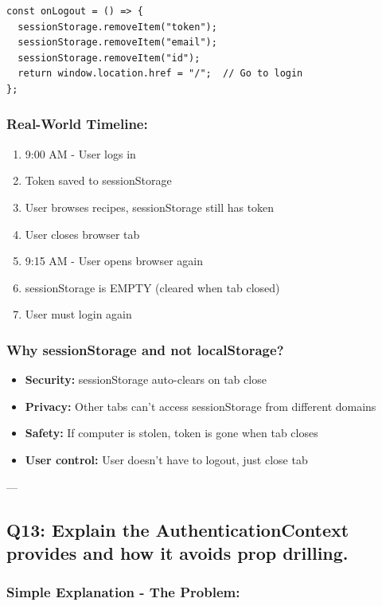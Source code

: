 \documentclass[12pt]{article}
\begin{document}
\begin{lstlisting}
const onLogout = () => {
  sessionStorage.removeItem("token");
  sessionStorage.removeItem("email");
  sessionStorage.removeItem("id");
  return window.location.href = "/";  // Go to login
};
\end{lstlisting}

\subsubsection*{Real-World Timeline:}

\begin{enumerate}
    \item 9:00 AM - User logs in
    \item Token saved to sessionStorage
    \item User browses recipes, sessionStorage still has token
    \item User closes browser tab
    \item 9:15 AM - User opens browser again
    \item sessionStorage is EMPTY (cleared when tab closed)
    \item User must login again
\end{enumerate}

\subsubsection*{Why sessionStorage and not localStorage?}

\begin{itemize}
    \item \textbf{Security:} sessionStorage auto-clears on tab close
    \item \textbf{Privacy:} Other tabs can't access sessionStorage from different domains
    \item \textbf{Safety:} If computer is stolen, token is gone when tab closes
    \item \textbf{User control:} User doesn't have to logout, just close tab
\end{itemize}

---

\subsection{Q13: Explain the AuthenticationContext provides and how it avoids prop drilling.}

\subsubsection*{Simple Explanation - The Problem:}
\end{document}
